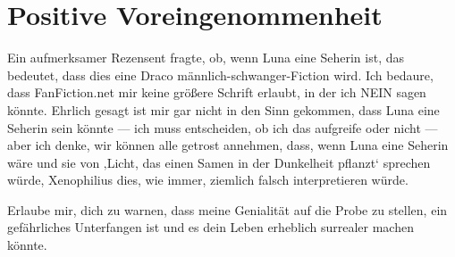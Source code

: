\chapter{Positive Voreingenommenheit}

\begin{chapterOpeningAuthorNote}
%
Ein aufmerksamer Rezensent fragte, ob, wenn Luna eine Seherin ist, das bedeutet, dass dies eine Draco männlich-schwanger-Fiction wird. Ich bedaure, dass FanFiction.net mir keine größere Schrift erlaubt, in der ich NEIN sagen könnte. Ehrlich gesagt ist mir gar nicht in den Sinn gekommen, dass Luna eine Seherin sein könnte — ich muss entscheiden, ob ich das aufgreife oder nicht — aber ich denke, wir können alle getrost annehmen, dass, wenn Luna eine Seherin wäre und sie von ‚Licht, das einen Samen in der Dunkelheit pflanzt‘ sprechen würde, Xenophilius dies, wie immer, ziemlich falsch interpretieren würde.
\end{chapterOpeningAuthorNote}
\begin{chapterOpeningQuote}
Erlaube mir, dich zu warnen, dass meine Genialität auf die Probe zu stellen, ein gefährliches Unterfangen ist und es dein Leben erheblich surrealer machen könnte.
\end{chapterOpeningQuote}

